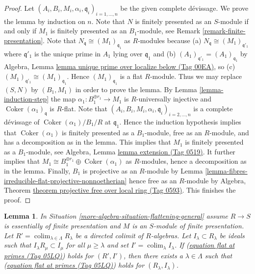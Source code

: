 \documentclass{amsart}
\theoremstyle{plain}
\newtheorem{lemma}[subsection]{Lemma}
\theoremstyle{definition}
\theoremstyle{remark}
\numberwithin{equation}{subsection}
\def\colim{\mathop{\mathrm{colim}}\nolimits}
\def\Coker{\mathop{\mathrm{Coker}}}
\begin{document}
\begin{proof}
Let $(A_i, B_i, M_i, \alpha_i, \mathfrak q_i)_{i = 1, \ldots, n}$
be the given complete d\'evissage. We prove the lemma by induction on $n$.
Note that $N$ is finitely presented as an $S$-module if and only if
$M_1$ is finitely presented as an $B_1$-module, see
Remark \ref{remark-finite-presentation}.
Note that $N_{\mathfrak q} \cong (M_1)_{\mathfrak q_1}$ as $R$-modules
because (a) $N_{\mathfrak q} \cong (M_1)_{\mathfrak q'_1}$ where
$\mathfrak q'_1$ is the unique prime in $A_1$ lying over $\mathfrak q_1$
and (b) $(A_1)_{\mathfrak q'_1} = (A_1)_{\mathfrak q_1}$ by
Algebra, Lemma \href{https://stacks.math.columbia.edu/tag/00EA}{lemma unique prime over localize below (Tag 00EA)},
so (c) $(M_1)_{\mathfrak q'_1} \cong (M_1)_{\mathfrak q_1}$.
Hence $(M_1)_{\mathfrak q_1}$ is a flat $R$-module. Thus we may replace
$(S, N)$ by $(B_1, M_1)$ in order to prove the lemma. By
Lemma \ref{lemma-induction-step}
the map $\alpha_1 : B_1^{\oplus r_1} \to M_1$ is $R$-universally injective
and $\Coker(\alpha_1)_{\mathfrak q}$ is $R$-flat.
Note that $(A_i, B_i, M_i, \alpha_i, \mathfrak q_i)_{i = 2, \ldots, n}$
is a complete d\'evissage of $\Coker(\alpha_1)/B_1/R$ at
$\mathfrak q_1$. Hence the induction hypothesis
implies that $\Coker(\alpha_1)$ is finitely presented as a
$B_1$-module, free as an $R$-module, and has a decomposition as in the lemma.
This implies that $M_1$ is finitely presented as a $B_1$-module, see
Algebra, Lemma \href{https://stacks.math.columbia.edu/tag/0519}{lemma extension (Tag 0519)}.
It further implies that
$M_1 \cong B_1^{\oplus r_1} \oplus \Coker(\alpha_1)$
as $R$-modules, hence a decomposition as in the lemma.
Finally, $B_1$ is projective as an $R$-module by
Lemma \ref{lemma-fibres-irreducible-flat-projective-nonnoetherian}
hence free as an $R$-module by
Algebra, Theorem \href{https://stacks.math.columbia.edu/tag/0593}{theorem projective free over local ring (Tag 0593)}.
This finishes the proof.
\end{proof}


\begin{lemma}
\label{more-algebra-lemma-limit-preserving-flat-at-primes}
In Situation \ref{more-algebra-situation-flattening-general}
assume $R \to S$ is essentially of finite presentation
and $M$ is an $S$-module of finite presentation. Let
$R' = \colim_{\lambda \in \Lambda} R_\lambda$
be a directed colimit of $R$-algebras. Let $I_\lambda \subset R_\lambda$
be ideals such that $I_\lambda R_\mu \subset I_\mu$ for all
$\mu \geq \lambda$ and set $I' = \colim_\lambda I_\lambda$.
If (\href{https://stacks.math.columbia.edu/tag/05LQ}{equation flat at primes (Tag 05LQ)}) holds for
$(R', I')$, then there exists a $\lambda \in \Lambda$ such that
(\href{https://stacks.math.columbia.edu/tag/05LQ}{equation flat at primes (Tag 05LQ)}) holds for $(R_\lambda, I_\lambda)$.
\end{lemma}
\end{document}
